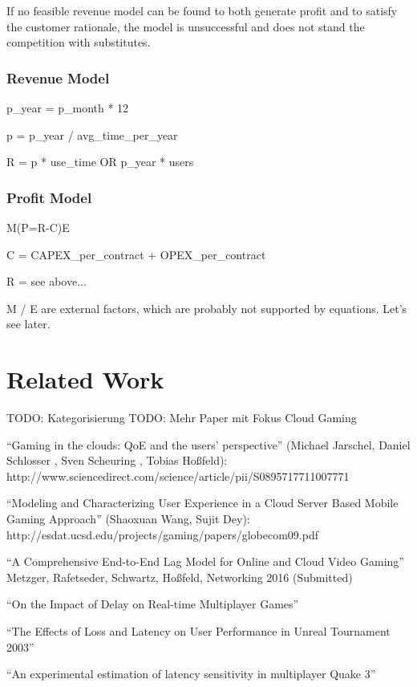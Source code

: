 If no feasible revenue model can be found to both generate profit and to satisfy the customer rationale, the model is unsuccessful and does not stand the competition with substitutes.


\subsubsection{Revenue Model}

p\_year = p\_month * 12

p = p\_year / avg\_time\_per\_year

R = p  * use\_time OR p\_year * users


\subsubsection{Profit Model}

M(P=R-C)E

C = CAPEX\_per\_contract + OPEX\_per\_contract

R = see above...

M / E are external factors, which are probably not supported by equations. Let’s see later.


\section{Related Work}

TODO: Kategorisierung
TODO: Mehr Paper mit Fokus Cloud Gaming

``Gaming in the clouds: QoE and the users’ perspective'' (Michael Jarschel, Daniel Schlosser , Sven Scheuring , Tobias Hoßfeld): http://www.sciencedirect.com/science/article/pii/S0895717711007771 


``Modeling and Characterizing User Experience in a Cloud Server Based Mobile Gaming Approach'' (Shaoxuan Wang, Sujit Dey): http://esdat.ucsd.edu/projects/gaming/papers/globecom09.pdf


``A Comprehensive End-to-End Lag Model for Online and Cloud Video Gaming'' Metzger, Rafetseder, Schwartz, Hoßfeld, Networking 2016 (Submitted)

``On the Impact of Delay on Real-time Multiplayer Games'' \cite{Pantel:2002:IDR:507670.507674}

``The Effects of Loss and Latency on User Performance in Unreal Tournament 2003'' \cite{Beigbeder:2004:ELL:1016540.1016556}

``An experimental estimation of latency sensitivity in multiplayer Quake 3'' \cite{1266180}

